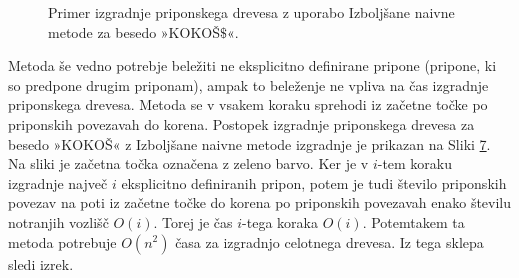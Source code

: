 \begin{figure}[htb]
\begin{subfigure}[t]{0.3\linewidth}
    \subcaption*{}
        
        \centering
        \label{fig:IzbolšanaNaivna1}
    \end{subfigure}
    \hspace{0.5cm}
    \begin{subfigure}[t]{0.3\linewidth}
        \subcaption*{}
        
        \centering
        \label{fig:IzbolšanaNaivna2}
    \end{subfigure}
    \hspace{0.5cm}
    \begin{subfigure}[t]{0.3\linewidth}
        \subcaption*{}
        
        \centering
        \label{fig:IzbolšanaNaivna3}
    \end{subfigure}
    
    \begin{subfigure}[t]{0.3\linewidth}
        \subcaption*{}
        
        \centering
        \label{fig:IzbolšanaNaivna4}
    \end{subfigure}
    \hspace{0.5cm}
    \begin{subfigure}[t]{0.3\linewidth}
        \subcaption*{}
        
        \centering
        \label{fig:IzbolšanaNaivna5}
    \end{subfigure}
    \hspace{0.5cm}
    \begin{subfigure}[t]{0.3\textwidth}
        \subcaption*{}
        
        \centering
        \label{fig:IzbolšanaNaivna6}
    \end{subfigure}

       \caption{Primer izgradnje priponskega drevesa z uporabo Izboljšane naivne metode za besedo »KOKOŠ$\$$«.} 
        \label{fig:IzbolšanaNaivna}
\end{figure}

Metoda še vedno potrebje beležiti ne eksplicitno definirane pripone (pripone, ki so predpone drugim priponam), ampak to beleženje ne vpliva na čas izgradnje priponskega drevesa. Metoda se v vsakem koraku sprehodi iz začetne točke po priponskih povezavah do korena. Postopek izgradnje priponskega drevesa za besedo »KOKOŠ« z Izboljšane naivne metode izgradnje je prikazan na Sliki \ref{fig:IzbolšanaNaivna}. Na sliki je začetna točka označena z zeleno barvo. Ker je v $i$-tem koraku izgradnje največ $i$ eksplicitno definiranih pripon, potem je tudi število priponskih povezav na poti iz začetne točke do korena po priponskih povezavah enako številu notranjih vozlišč $O(i)$. Torej je čas $i$-tega koraka $O(i)$. Potemtakem ta metoda potrebuje $O(n^2)$ časa za izgradnjo celotnega drevesa. Iz tega sklepa sledi izrek.

